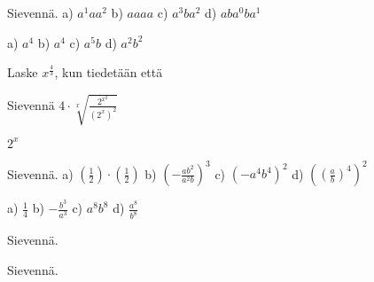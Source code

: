 \begin{tehtavasivu}
    \begin{tehtava}
        Sievennä. 
        a) $a^1 a a^2$ 
        b) $aaaa$ 
        c) $a^3ba^2$ 
        d) $aba^0ba^1$
        
        \begin{vastaus}
            a) $a^4$ 
            b) $a^4$ 
            c) $a^5b$ 
            d) $a^2b^2$
        \end{vastaus}
    \end{tehtava}

    \begin{tehtava}
Laske $x^{\frac{4}{3}}$, kun tiedetään että
\begin{vastaus}
\end{vastaus}
    \end{tehtava}
 
 \begin{tehtava}
Sievennä 
$4 \cdot \sqrt[x]{\frac{2^{x^2}}{(2^x)^2}}$
\begin{vastaus}
$2^x$
\end{vastaus}

 \end{tehtava}

 \begin{tehtava}
        Sievennä. 
        a) $(\frac{1}{2})\cdot(\frac{1}{2})$ 
        b) $(-\frac{ab^2}{a^2b})^3$ 
        c) $(-a^4b^4)^2$ 
        d) $\left((\frac{a}{b})^4\right)^2$
        
        \begin{vastaus}
            a) $\frac{1}{4}$ 
            b) $-\frac{b^3}{a^3}$ 
            c) $a^8b^8$ 
            d) $\frac{a^8}{b^8}$
        \end{vastaus}
    \end{tehtava}
\begin{tehtava}
Sievennä.

\begin{vastaus}
\end{vastaus}
\end{tehtava}

\begin{tehtava}
Sievennä.


\end{tehtava}
\end{tehtavasivu}
